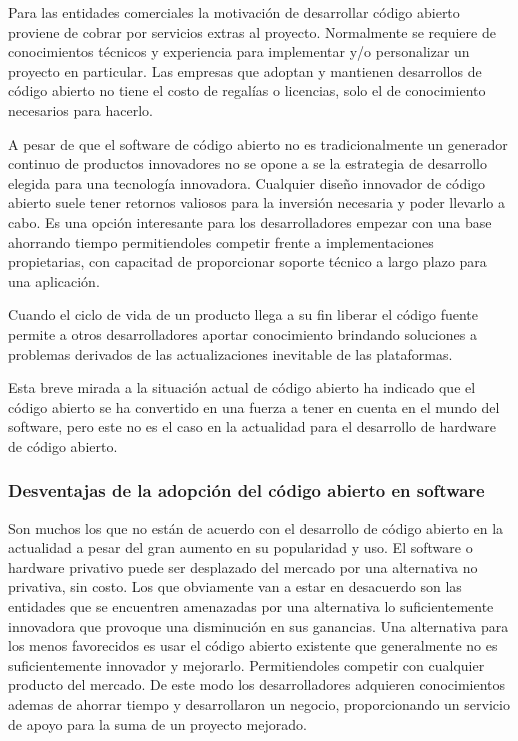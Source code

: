 	Para las entidades comerciales la motivación de desarrollar código abierto proviene de cobrar por servicios extras al proyecto. Normalmente se
	requiere de conocimientos técnicos y experiencia para implementar y/o personalizar un proyecto en particular. Las empresas que adoptan y mantienen
	desarrollos de código abierto no tiene el costo de regalías o licencias, solo el de conocimiento necesarios para hacerlo.

	A pesar de que el software de código abierto no es tradicionalmente un generador continuo de productos innovadores no se opone a se la estrategia de
	desarrollo elegida para una tecnología innovadora. Cualquier diseño innovador de código abierto suele tener retornos valiosos para la inversión
	necesaria y poder llevarlo a cabo. Es una opción interesante para los desarrolladores empezar con una base ahorrando tiempo  permitiendoles competir
	frente a  implementaciones propietarias, con capacitad de proporcionar soporte técnico a largo plazo para una aplicación.

	Cuando el ciclo de vida de un producto llega a su fin liberar el código fuente permite a otros desarrolladores aportar conocimiento brindando
	soluciones a problemas derivados de las actualizaciones inevitable de las plataformas.

	Esta breve mirada a la situación actual de código abierto ha indicado que el código abierto se ha convertido en una fuerza a tener en cuenta en el
	mundo del software, pero este no es el caso en la actualidad para el desarrollo de hardware de código abierto.


\subsubsection{Desventajas de la adopción del código abierto en software}
	Son muchos los que no están de acuerdo con el desarrollo de código abierto en la actualidad a pesar del gran aumento en su popularidad y uso. El
	software o hardware privativo puede ser desplazado del mercado por una alternativa no privativa, sin costo. Los que obviamente van a estar en
	desacuerdo son las entidades que se encuentren amenazadas por una alternativa lo suficientemente innovadora que provoque una disminución en sus
	ganancias. Una alternativa para los menos favorecidos es usar el código abierto existente que generalmente no es suficientemente innovador y
	mejorarlo. Permitiendoles competir con cualquier producto del mercado. De este modo los desarrolladores adquieren conocimientos ademas de ahorrar
	tiempo y desarrollaron un negocio, proporcionando un servicio de apoyo para la suma de un proyecto mejorado.

